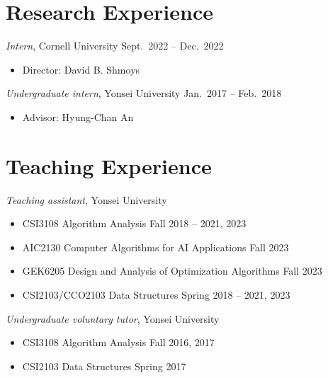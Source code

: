 \documentclass{article}
\newcommand{\killinitspace}{-0.7em}
\begin{document}
\section{Research Experience}
\textsl{Intern}, Cornell University \hfill Sept.~2022 -- Dec.~2022
\vspace{\killinitspace}
\begin{itemize}
\item Director: David B. Shmoys
\end{itemize}

\textsl{Undergraduate intern}, Yonsei University \hfill Jan.~2017 -- Feb.~2018
\vspace{\killinitspace}
\begin{itemize}
\item Advisor: Hyung-Chan An
\end{itemize}

\newpage
\section{Teaching Experience}
\textsl{Teaching assistant}, Yonsei University
\vspace{\killinitspace}
\begin{itemize}
\item CSI3108 Algorithm Analysis \hfill Fall 2018 -- 2021, 2023
\item AIC2130 Computer Algorithms for AI Applications \hfill Fall 2023
\item GEK6205 Design and Analysis of Optimization Algorithms \hfill Fall 2023
\item CSI2103/CCO2103 Data Structures \hfill Spring 2018 -- 2021, 2023
\end{itemize}

\textsl{Undergraduate voluntary tutor}, Yonsei University
\vspace{\killinitspace}
\begin{itemize}
\item CSI3108 Algorithm Analysis \hfill Fall 2016, 2017
\item CSI2103 Data Structures \hfill Spring 2017
\end{itemize}


\end{document}
